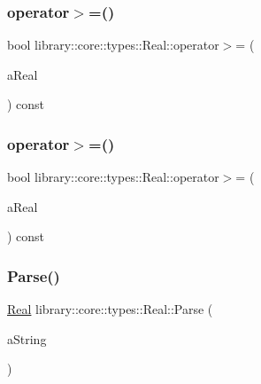 \mbox{\label{classlibrary_1_1core_1_1types_1_1_real_a5046bc6db8251a1d3ac5bbc43f07db5d}} 
\subsubsection{\texorpdfstring{operator$>$=()}{operator>=()}\hspace{0.1cm}{\footnotesize\ttfamily [1/2]}}
{\footnotesize\ttfamily bool library\+::core\+::types\+::\+Real\+::operator$>$= (\begin{DoxyParamCaption}\item[{const \mbox{\hyperlink{classlibrary_1_1core_1_1types_1_1_real}{Real}} \&}]{a\+Real }\end{DoxyParamCaption}) const}

\mbox{\label{classlibrary_1_1core_1_1types_1_1_real_aa36e6de2ef7bc2d234be64417d36013d}} 
\subsubsection{\texorpdfstring{operator$>$=()}{operator>=()}\hspace{0.1cm}{\footnotesize\ttfamily [2/2]}}
{\footnotesize\ttfamily bool library\+::core\+::types\+::\+Real\+::operator$>$= (\begin{DoxyParamCaption}\item[{const \mbox{\hyperlink{classlibrary_1_1core_1_1types_1_1_real_a9c5c8826b7e5a8e39544d23fea6c0e1c}{Real\+::\+Value\+Type}} \&}]{a\+Real }\end{DoxyParamCaption}) const}

\mbox{\label{classlibrary_1_1core_1_1types_1_1_real_a7ec624abaddba3a9cabf094a6a69f484}} 
\subsubsection{\texorpdfstring{Parse()}{Parse()}}
{\footnotesize\ttfamily \mbox{\hyperlink{classlibrary_1_1core_1_1types_1_1_real}{Real}} library\+::core\+::types\+::\+Real\+::\+Parse (\begin{DoxyParamCaption}\item[{const \mbox{\hyperlink{classlibrary_1_1core_1_1types_1_1_string}{types\+::\+String}} \&}]{a\+String }\end{DoxyParamCaption})\hspace{0.3cm}{\ttfamily [static]}}

